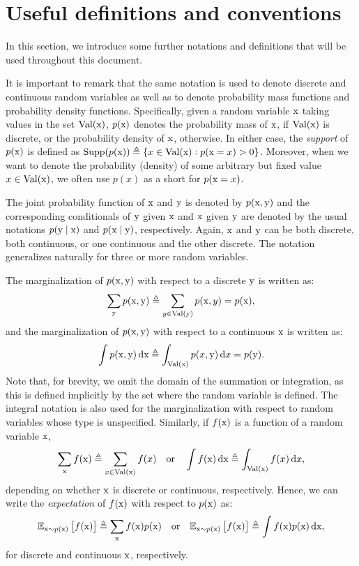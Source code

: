 \section{Useful definitions and conventions}
\label{sec:definitions}
In this section, we introduce some further notations and definitions that will be used throughout this document.

It is important to remark that the same notation is used to denote discrete and continuous random variables as well as to denote probability mass functions and probability density functions. Specifically, given a random variable ${\textnormal{x}}$ taking values in the set $\mathrm{Val}({\textnormal{x}})$, $p({\textnormal{x}})$ denotes the probability mass of ${\textnormal{x}}$, if $\mathrm{Val}({\textnormal{x}})$ is discrete, or the probability density of ${\textnormal{x}}$, otherwise. In either case, the \emph{support} of $p({\textnormal{x}})$ is defined as $\mathrm{Supp}(p({\textnormal{x}})) \triangleq \lbrace x \in \mathrm{Val}({\textnormal{x}}): p({\textnormal{x}}=x) > 0 \rbrace$. Moreover, when we want to denote the probability (density) of some arbitrary but fixed value $x \in \mathrm{Val}({\textnormal{x}})$, we often use $p(x)$ as a short for $p({\textnormal{x}}=x)$.

The joint probability function of ${\textnormal{x}}$ and ${\textnormal{y}}$ is denoted by $p({\textnormal{x}},{\textnormal{y}})$ and the corresponding conditionals of ${\textnormal{y}}$ given ${\textnormal{x}}$ and ${\textnormal{x}}$ given ${\textnormal{y}}$ are denoted by the usual notations $p({\textnormal{y}} \mid {\textnormal{x}})$ and $p({\textnormal{x}} \mid {\textnormal{y}})$, respectively. Again, ${\textnormal{x}}$ and ${\textnormal{y}}$ can be both discrete, both continuous, or one continuous and the other discrete. The notation generalizes naturally for three or more random variables.

The marginalization of $p({\textnormal{x}},{\textnormal{y}})$ with respect to a discrete ${\textnormal{y}}$ is written as:
\begin{equation}
    \sum_{{\textnormal{y}}} p({\textnormal{x}},{\textnormal{y}}) \triangleq \sum_{y \in \mathrm{Val}({\textnormal{y}})} p({\textnormal{x}},y) = p({\textnormal{x}}),
\end{equation}
and the marginalization of $p({\textnormal{x}},{\textnormal{y}})$ with respect to a continuous ${\textnormal{x}}$ is written as:
\begin{equation}
    \int p({\textnormal{x}},{\textnormal{y}}) {\,\text{d}} {\textnormal{x}} \triangleq \int_{\mathrm{Val}({\textnormal{x}})} p(x,{\textnormal{y}}) {\,\text{d}} x = p({\textnormal{y}}).
\end{equation}
Note that, for brevity, we omit the domain of the summation or integration, as this is defined implicitly by the set where the random variable is defined. The integral notation is also used for the marginalization with respect to random variables whose type is unspecified. Similarly, if $f({\textnormal{x}})$ is a function of a random variable ${\textnormal{x}}$,
\begin{equation}
    \sum_{\textnormal{x}} f({\textnormal{x}}) \triangleq \sum_{x \in \mathrm{Val}({\textnormal{x}})} f(x) \quad \text{or} \quad \int f({\textnormal{x}}) {\,\text{d}} {\textnormal{x}} \triangleq \int_{\mathrm{Val}({\textnormal{x}})} f(x) {\,\text{d}} x,
\end{equation}
depending on whether ${\textnormal{x}}$ is discrete or continuous, respectively. Hence, we can write the \emph{expectation} of $f({\textnormal{x}})$ with respect to $p({\textnormal{x}})$ as:
\begin{equation}
    \mathbb{E}_{{\textnormal{x}} \sim p({\textnormal{x}})} \left[f({\textnormal{x}})\right] \triangleq \sum_{\textnormal{x}} f({\textnormal{x}}) p({\textnormal{x}}) \quad \text{or} \quad \mathbb{E}_{{\textnormal{x}} \sim p({\textnormal{x}})} \left[f({\textnormal{x}})\right] \triangleq \int f({\textnormal{x}}) p({\textnormal{x}}) {\,\text{d}} {\textnormal{x}},
\end{equation}
for discrete and continuous ${\textnormal{x}}$, respectively.

